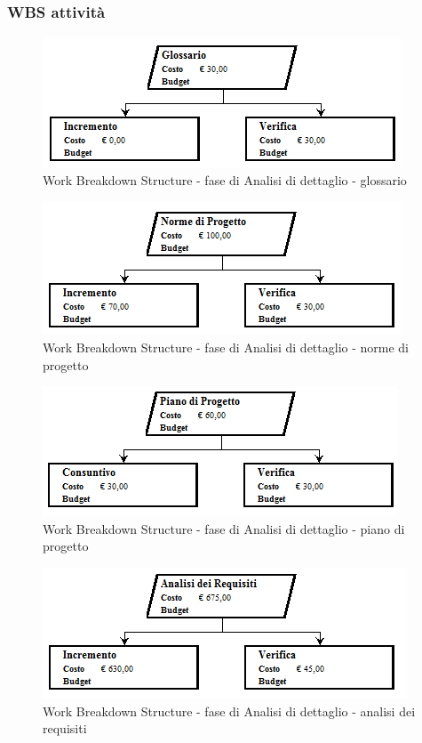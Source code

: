 \documentclass[a4paper]{article}
\begin{document}
			\subsubsection{WBS attività}
				\begin{figure}[H]
					\centering
					\includegraphics[width=\textwidth]{wbs/wbs_dettaglio_1}
					\caption{Work Breakdown Structure - fase di Analisi di dettaglio - glossario}
				\end{figure}
				\begin{figure}[H]
					\centering
					\includegraphics[width=\textwidth]{wbs/wbs_dettaglio_2}
					\caption{Work Breakdown Structure - fase di Analisi di dettaglio - norme di progetto}
				\end{figure}
				\begin{figure}[H]
					\centering
					\includegraphics[width=\textwidth]{wbs/wbs_dettaglio_3}
					\caption{Work Breakdown Structure - fase di Analisi di dettaglio - piano di progetto}
				\end{figure}
				\begin{figure}[H]
					\centering
					\includegraphics[width=\textwidth]{wbs/wbs_dettaglio_4}
					\caption{Work Breakdown Structure - fase di Analisi di dettaglio - analisi dei requisiti}
				\end{figure}
\end{document}
